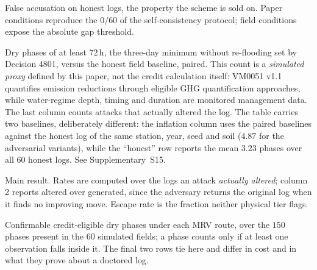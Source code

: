 





\begin{table}[!t]
\centering
\caption{False accusation on honest logs, the property the
scheme is sold on. Paper conditions reproduce the $0/60$ of the self-consistency
protocol; field conditions expose the absolute gap threshold.}
\label{tab:falseacc}
\footnotesize

\end{table}

\begin{table}[!t]
\centering
\caption{Dry phases of at least $72$\,h, the three-day minimum without re-flooding set by
Decision 4801, versus the honest field baseline, paired. This count is a
\emph{simulated proxy} defined by this paper, not the credit calculation itself:
VM0051 v1.1 quantifies emission reductions through eligible GHG quantification
approaches, while water-regime depth, timing and duration are monitored management
data. The
last column counts attacks that actually altered the log. The table carries two
baselines, deliberately different: the inflation column uses the paired baselines
against the honest log of the same station, year, seed and soil ($4.87$ for the
adversarial variants), while the ``honest'' row reports the mean $3.23$ phases
over all $60$ honest logs. See Supplementary~S15.}
\label{tab:credit}
\footnotesize

\end{table}

\begin{table}[!t]
\centering
\caption{Main result. Rates are computed over the logs an attack
\emph{actually altered}; column 2 reports altered over generated, since the
adversary returns the original log when it finds no improving move. Escape rate
is the fraction neither physical tier flags.}
\label{tab:defence}
\footnotesize

\end{table}



\begin{table}[!t]
\centering
\caption{Confirmable credit-eligible dry phases under each MRV route, over the $150$ phases present in the $60$ simulated fields; a phase counts only if at least one observation falls inside it. The final two rows tie here and differ in cost and in what they prove about a doctored log.}
\label{tab:benchmark}
\footnotesize

\end{table}

